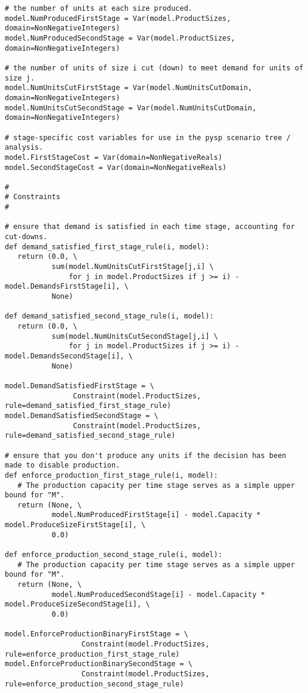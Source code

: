 {\begin{verbatim}
# the number of units at each size produced.
model.NumProducedFirstStage = Var(model.ProductSizes, domain=NonNegativeIntegers)
model.NumProducedSecondStage = Var(model.ProductSizes, domain=NonNegativeIntegers)

# the number of units of size i cut (down) to meet demand for units of size j.
model.NumUnitsCutFirstStage = Var(model.NumUnitsCutDomain, domain=NonNegativeIntegers)
model.NumUnitsCutSecondStage = Var(model.NumUnitsCutDomain, domain=NonNegativeIntegers)

# stage-specific cost variables for use in the pysp scenario tree / analysis.
model.FirstStageCost = Var(domain=NonNegativeReals)
model.SecondStageCost = Var(domain=NonNegativeReals)

#
# Constraints
#

# ensure that demand is satisfied in each time stage, accounting for cut-downs.
def demand_satisfied_first_stage_rule(i, model):
   return (0.0, \
           sum(model.NumUnitsCutFirstStage[j,i] \
               for j in model.ProductSizes if j >= i) - model.DemandsFirstStage[i], \
           None)

def demand_satisfied_second_stage_rule(i, model):
   return (0.0, \
           sum(model.NumUnitsCutSecondStage[j,i] \
               for j in model.ProductSizes if j >= i) - model.DemandsSecondStage[i], \
           None)

model.DemandSatisfiedFirstStage = \
                Constraint(model.ProductSizes, rule=demand_satisfied_first_stage_rule)
model.DemandSatisfiedSecondStage = \
                Constraint(model.ProductSizes, rule=demand_satisfied_second_stage_rule)

# ensure that you don't produce any units if the decision has been made to disable production.
def enforce_production_first_stage_rule(i, model):
   # The production capacity per time stage serves as a simple upper bound for "M".
   return (None, \
           model.NumProducedFirstStage[i] - model.Capacity * model.ProduceSizeFirstStage[i], \
           0.0)

def enforce_production_second_stage_rule(i, model):
   # The production capacity per time stage serves as a simple upper bound for "M".
   return (None, \
           model.NumProducedSecondStage[i] - model.Capacity * model.ProduceSizeSecondStage[i], \
           0.0)

model.EnforceProductionBinaryFirstStage = \
                  Constraint(model.ProductSizes, rule=enforce_production_first_stage_rule)
model.EnforceProductionBinarySecondStage = \
                  Constraint(model.ProductSizes, rule=enforce_production_second_stage_rule)


\end{verbatim}}
